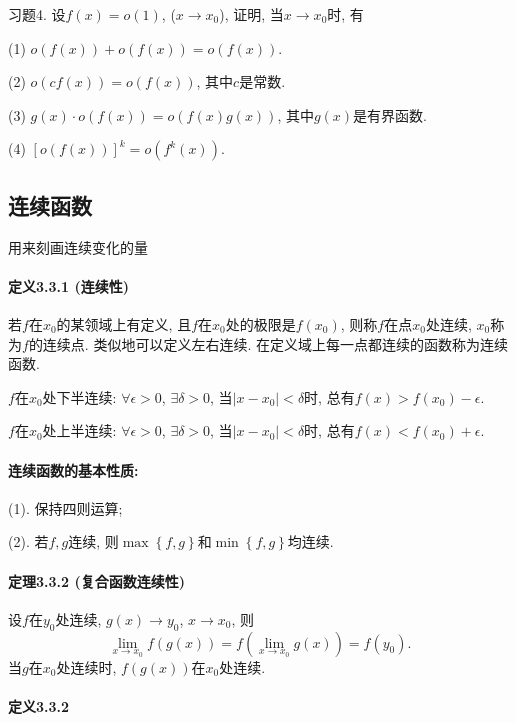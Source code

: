 习题4. 设$f(x)=o(1)$, ($x\to x_{0}$), 证明, 当$x\to x_{0}$时, 有

(1) $o(f(x))+o(f(x))=o(f(x))$.

(2) $o(cf(x))=o(f(x))$, 其中$c$是常数.

(3) $g(x)\cdot o(f(x))=o(f(x)g(x))$, 其中$g(x)$是有界函数.

(4) $[o(f(x))]^{k}=o\left(f^{k}(x)\right)$.

\subsection{连续函数}

用来刻画连续变化的量

\paragraph{定义3.3.1 (连续性)}

若$f$在$x_{0}$的某领域上有定义, 且$f$在$x_{0}$处的极限是$f(x_{0})$, 则称$f$在点$x_{0}$处连续,
$x_{0}$称为$f$的连续点. 类似地可以定义左右连续. 在定义域上每一点都连续的函数称为连续函数.

$f$在$x_{0}$处下半连续: $\forall\epsilon>0$, $\exists\delta>0$, 当$\left|x-x_{0}\right|<\delta$时,
总有$f(x)>f(x_{0})-\epsilon$.

$f$在$x_{0}$处上半连续: $\forall\epsilon>0$, $\exists\delta>0$, 当$\left|x-x_{0}\right|<\delta$时,
总有$f(x)<f(x_{0})+\epsilon$.

\paragraph{连续函数的基本性质:}

(1). 保持四则运算;

(2). 若$f,g$连续, 则$\max\left\{ f,g\right\} $和$\min\left\{ f,g\right\} $均连续.

\paragraph{定理3.3.2 (复合函数连续性)}

设$f$在$y_{0}$处连续, $g(x)\to y_{0}$, $x\to x_{0}$, 则
\[
\lim_{x\to x_{0}}f(g(x))=f\left(\lim_{x\to x_{0}}g(x)\right)=f(y_{0}).
\]
当$g$在$x_{0}$处连续时, $f(g(x))$在$x_{0}$处连续.

\paragraph{定义3.3.2}

